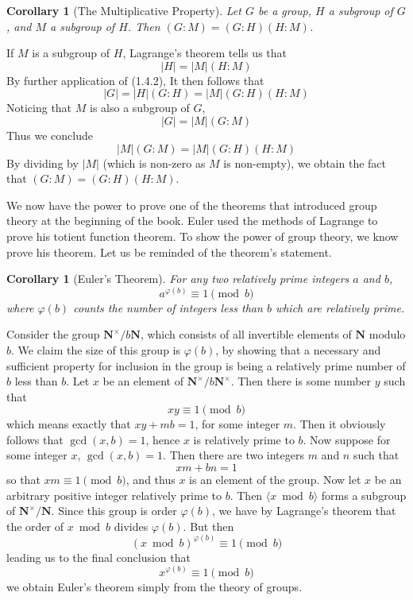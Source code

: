 \documentclass[12pt]{amsbook}
\makeatletter
\theoremstyle{plain}
\newtheorem{corollary}[theorem]{Corollary}
\theoremstyle{definition}
\renewenvironment{proof}[1][\proofname]{\par
  \pushQED{\qed}%
  \normalfont \topsep6\p@\@plus6\p@\relax
  \list{}{\leftmargin=0em
          \rightmargin=\leftmargin
          \settowidth{\itemindent}{\itshape#1}%
          \labelwidth=\itemindent}

  \item[\hskip\labelsep
        \itshape
    #1\@addpunct{.}]\ignorespaces
}{%
  \popQED\endlist\@endpefalse
}
\makeatother
\begin{document}
\begin{corollary}[The Multiplicative Property] 
    Let $G$ be a group, $H$ a subgroup of $G$, and $M$ a subgroup of $H$. Then $(G:M) = (G:H)(H:M)$.
\end{corollary}
\begin{proof}
    If $M$ is a subgroup of $H$, Lagrange's theorem tells us that
    \[ |H| = |M|(H:M) \]
    By further application of (1.4.2), It then follows that
    \[ |G| = |H|(G:H) = |M|(G:H)(H:M) \]
    Noticing that $M$ is also a subgroup of $G$,
    \[ |G| = |M|(G:M) \]
    Thus we conclude
    \[ |M|(G:M) = |M|(G:H)(H:M) \]
    By dividing by $|M|$ (which is non-zero as $M$ is non-empty), we obtain the fact that $(G:M) = (G:H)(H:M)$.
\end{proof}

We now have the power to prove one of the theorems that introduced group theory at the beginning of the book. Euler used the methods of Lagrange to prove his totient function theorem. To show the power of group theory, we know prove his theorem. Let us be reminded of the theorem's statement.

\begin{corollary}[Euler's Theorem] 
    For any two relatively prime integers $a$ and $b$,
    \[ a^{\varphi(b)} \equiv 1 \pmod{b} \]
    where $\varphi(b)$ counts the number of integers less than $b$ which are relatively prime.
\end{corollary}
\begin{proof}
    Consider the group $\mathbf{N}^\times/b\mathbf{N}$, which consists of all invertible elements of $\mathbf{N}$ modulo $b$. We claim the size of this group is $\varphi(b)$, by showing that a necessary and sufficient property for inclusion in the group is being a relatively prime number of $b$ less than $b$. Let $x$ be an element of $\mathbf{N}^\times/b\mathbf{N}^\times$. Then there is some number $y$ such that
    \[ xy \equiv 1 \pmod{b} \]
    which means exactly that $xy + mb = 1$, for some integer $m$. Then it obviously follows that $\gcd(x,b) = 1$, hence $x$ is relatively prime to $b$. Now suppose for some integer $x$, $\gcd(x,b) = 1$. Then there are two integers $m$ and $n$ such that
    \[ xm + bn = 1 \]
    so that $xm \equiv 1 \pmod{b}$, and thus $x$ is an element of the group. Now let $x$ be an arbitrary positive integer relatively prime to $b$. Then $\langle x \bmod b \rangle$ forms a subgroup of $\mathbf{N}^\times/\mathbf{N}$. Since this group is order $\varphi(b)$, we have by Lagrange's theorem that the order of $x \bmod b$ divides $\varphi(b)$. But then
    \[ (x \bmod b)^{\varphi(b)} \equiv 1 \pmod{b} \]
    leading us to the final conclusion that
    \[ x^{\varphi(b)} \equiv 1 \pmod{b} \]
    we obtain Euler's theorem simply from the theory of groups.
\end{proof}
\end{document}
